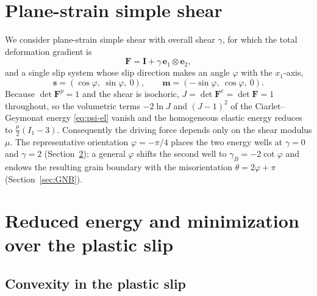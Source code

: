 \documentclass[12pt]{article}
\theoremstyle{plain}
\theoremstyle{definition}
\newcommand{\bF}{\bm{F}}
\newcommand{\bs}{\bm{s}}
\newcommand{\bmm}{\bm{m}}
\newcommand{\bI}{\bm{I}}
\newcommand{\Fe}{\bF^{e}}
\newcommand{\Fp}{\bF^{p}}
\begin{document}
\section{Plane-strain simple shear}\label{sec:shear}
We consider plane-strain simple shear with overall shear $\gamma$, for which the
total deformation gradient is
\begin{equation}\label{eq:shear-F}
  \bF=\bI+\gamma\,\bm{e}_1\otimes\bm{e}_2 ,
\end{equation}
and a single slip system whose slip direction makes an angle $\varphi$ with the
$x_1$-axis,
\begin{equation*}
  \bs=(\cos\varphi,\ \sin\varphi,\ 0),\qquad
  \bmm=(-\sin\varphi,\ \cos\varphi,\ 0).
\end{equation*}
Because $\det\Fp=1$ and the shear is isochoric, $J=\det\Fe=\det\bF=1$ throughout,
so the volumetric terms $-2\ln J$ and $(J-1)^2$ of the Ciarlet--Geymonat
energy \eqref{eq:psi-el} vanish and the homogeneous elastic energy reduces to
$\tfrac{\mu}{2}(I_1-3)$. Consequently the driving force depends only on the shear
modulus $\mu$. The representative orientation $\varphi=-\pi/4$ places the two
energy wells at $\gamma=0$ and $\gamma=2$ (Section~\ref{sec:reduced}); a general
$\varphi$ shifts the second well to $\gamma_B=-2\cot\varphi$ and endows the
resulting grain boundary with the misorientation
$\theta=2\varphi+\pi$ (Section~\ref{sec:GNB}).

\section{Reduced energy and minimization over the plastic slip}\label{sec:reduced}

\subsection{Convexity in the plastic slip}\label{sec:convexbeta}
\end{document}
